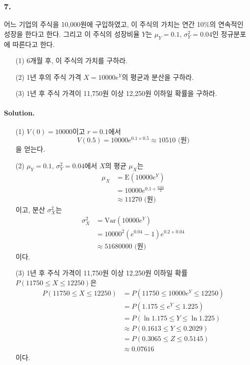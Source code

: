 \subsubsection{7.} 어느 기업의 주식을 10,000원에 구입하였고, 이 주식의 가치는 연간 10\%의 연속적인 성장을 한다고 한다.
그리고 이 주식의 성장비율 $Y$는 $\mu_Y=0.1$, $\sigma^2_Y=0.04$인 정규분포에 따른다고 한다.

\begin{itemize}
	\item [(1)] 6개월 후, 이 주식의 가치를 구하라.
	\item [(2)] 1년 후의 주식 가격 $X=10000e^Y$의 평균과 분산을 구하라.
	\item [(3)] 1년 후 주식 가격이 11,750원 이상 12,250원 이하일 확률을 구하라.
\end{itemize}

\paragraph{Solution.}

\begin{itemize}
	\item [(1)] {
		$V\left(0\right)=10000$이고 $r=0.1$에서
		\[V\left(0.5\right)=10000e^{0.1\times0.5} \approx 10510\mbox{ (원)}\]
		을 얻는다.
	}
	\item [(2)] {
		$\mu_Y=0.1$, $\sigma^2_Y=0.04$에서 $X$의 평균 $\mu_X$는
		\begin{align*}
			\mu_X &= \mathrm{E}\left(10000 e^Y\right) \\
			&= 10000 e^{0.1+\frac{0.04}{2}}\\
			&\approx 11270\mbox{ (원)}
		\end{align*}
		이고, 분산 $\sigma^2_X$는
		\begin{align*}
			\sigma^2_X &= \mathrm{Var}\left(10000 e^Y\right) \\
			&= 10000^2 \left(e^{0.04}-1\right)e^{0.2+0.04}\\
			&\approx 51680000 \mbox{ (원)}
		\end{align*}
		이다.
	}
	\item [(3)] {
		1년 후 주식 가격이 11,750원 이상 12,250원 이하일 확률 $P\left(11750 \leq X \leq 12250\right)$은
		\begin{align*}
			P\left(11750 \leq X \leq 12250\right) &= P\left(11750 \leq 10000e^Y \leq 12250\right) \\
			&= P\left(1.175 \leq e^Y \leq 1.225\right) \\
			&= P\left(\ln 1.175 \leq Y \leq \ln 1.225\right) \\
			&\approx P\left(0.1613 \leq Y \leq 0.2029\right) \\
			&= P\left(0.3065 \leq Z \leq 0.5145\right) \\
			&\approx 0.07616
		\end{align*}
		이다.
	}
\end{itemize}